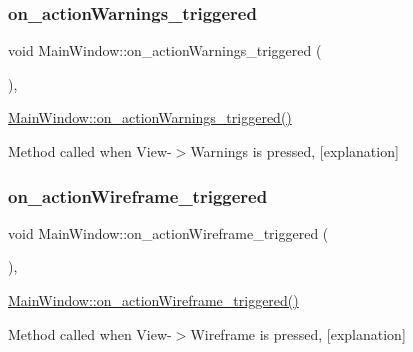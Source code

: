 \subsubsection{\texorpdfstring{on\+\_\+action\+Warnings\+\_\+triggered}{on\_actionWarnings\_triggered}}
{\footnotesize\ttfamily void Main\+Window\+::on\+\_\+action\+Warnings\+\_\+triggered (\begin{DoxyParamCaption}{ }\end{DoxyParamCaption})\hspace{0.3cm}{\ttfamily [private]}, {\ttfamily [slot]}}



\hyperlink{class_main_window_a018b6c693a863ad693ae5c5711e7e9a0}{Main\+Window\+::on\+\_\+action\+Warnings\+\_\+triggered()} 

Method called when View-\/$>$Warnings is pressed, \mbox{[}explanation\mbox{]} \mbox{\label{class_main_window_a96b669e857f9f600d938cc735632da04}} 
\subsubsection{\texorpdfstring{on\+\_\+action\+Wireframe\+\_\+triggered}{on\_actionWireframe\_triggered}}
{\footnotesize\ttfamily void Main\+Window\+::on\+\_\+action\+Wireframe\+\_\+triggered (\begin{DoxyParamCaption}{ }\end{DoxyParamCaption})\hspace{0.3cm}{\ttfamily [private]}, {\ttfamily [slot]}}



\hyperlink{class_main_window_a96b669e857f9f600d938cc735632da04}{Main\+Window\+::on\+\_\+action\+Wireframe\+\_\+triggered()} 

Method called when View-\/$>$Wireframe is pressed, \mbox{[}explanation\mbox{]} \mbox{\label{class_main_window_ac8f6bda78b3a005a294a7a1304acd1ec}} 
